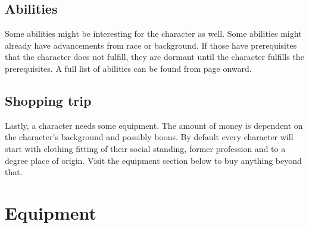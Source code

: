 \documentclass[12pt,a4paper,openany]{book}
\begin{document}
	\section{Abilities}
	Some abilities might be interesting for the character as well. Some abilities might already have advancements from race or background. If those have prerequisites that the character does not fulfill, they are dormant until the character fulfills the prerequisites. A full list of abilities can be found from page \pageref{abilitylist} onward.
	\section{Shopping trip}
	Lastly, a character needs some equipment. The amount of money is dependent on the character’s background and possibly boons. By default every character will start with clothing fitting of their social standing, former profession and to a degree place of origin. Visit the equipment section below to buy anything beyond that. 
	
	\chapter{Equipment}
\end{document}
